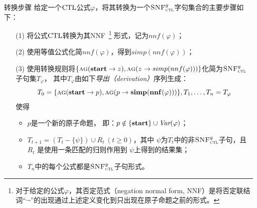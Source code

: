 \documentclass[9pt, CJK]{beamer}
\begin{document}
\begin{frame}
{{\begin{block}{转换步骤}
			给定一个$\textrm{CTL}$公式$\varphi$，将其转换为一个${\textsc{SNF}_{\textsc{ctl}}^g}$字句集合的主要步骤如下：
			\begin{itemize}
				\item[(1)]  将公式$\textrm{CTL}$转换为其NNF~\footnote{对于给定的公式$\varphi$，其否定范式（negation normal form, NNF）是将否定联结词“$\neg$”的出现通过上述定义变化到只出现在原子命题之前的形式。} 
				形式，记为$nnf(\varphi)$；
				\item[(2)]  使用等值公式化简$nnf(\varphi)$，得到$simp(nnf(\varphi))$；
				\item[(3)] 使用转换规则将$\{\textsc{a}\textsc{g}(\textbf{start}\rightarrow z), \textsc{a}\textsc{g}(z \rightarrow simp(nnf(\varphi)))\}$化简为${\textsc{SNF}_{\textsc{ctl}}^g}$子句集$T_{\varphi}$， 
				其中$T_\varphi$由如下\emph{导出（derivation）}序列生成：
				\[ T_0=\{\textsc{a}\textsc{g}(\textbf{start}\rightarrow p), \textsc{a}\textsc{g}(p\rightarrow {\bf simp}({\bf nnf}(\varphi)))\}, T_1, \ldots, T_n=T_\varphi\]
				使得
				\begin{itemize}
					\item $p$是一个新的原子命题， 即：$p\notin \{\textbf{start}\}\cup\textit{Var}(\varphi)$；
					\item $T_{t+1} = (T_t - \{\psi\}) \cup R_t~(t\ge 0)$，其中 $\psi$为$T_t$中的非${\textsc{SNF}_{\textsc{ctl}}^g}$子句，且 $R_t$
					是使用一条匹配的归则作用到 $\psi$上得到的结果集；
					\item  $T_n$中的每个公式都是${\textsc{SNF}_{\textsc{ctl}}^g}$子句形式。
				\end{itemize}
			\end{itemize}
		\end{block}
	}
	}
\end{frame}
\end{document}
